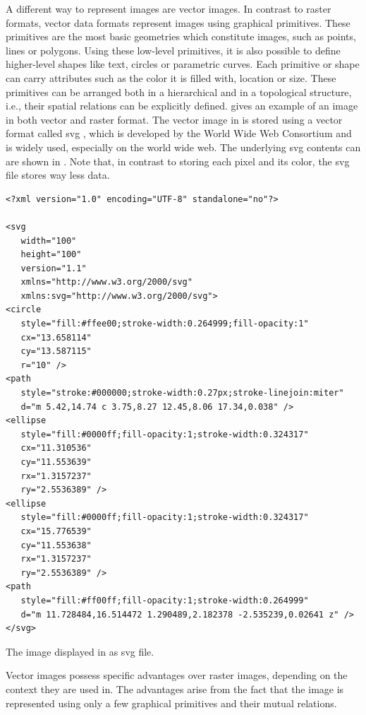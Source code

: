 A different way to represent images are vector images. In contrast to raster formats, vector data formats represent images using graphical primitives. These primitives are the most basic geometries which constitute images, such as points, lines or polygons. Using these low-level primitives, it is also possible to define higher-level shapes like text, circles or parametric curves. Each primitive or shape can carry attributes such as the color it is filled with, location or size. These primitives can be arranged both in a hierarchical and in a topological structure, i.e., their spatial relations can be explicitly defined.  gives an example of an image in both vector and raster format. The vector image in  is stored using a vector format called \gls{svg} \citep{w3csvg}, which is developed by the World Wide Web Consortium and is widely used, especially on the world wide web. The underlying \gls{svg} contents can are shown in . Note that, in contrast to storing each pixel and its color, the \gls{svg} file stores way less data. 

\begin{listing}
\begin{verbatim}
<?xml version="1.0" encoding="UTF-8" standalone="no"?>

<svg
   width="100"
   height="100"
   version="1.1"
   xmlns="http://www.w3.org/2000/svg"
   xmlns:svg="http://www.w3.org/2000/svg">
<circle
   style="fill:#ffee00;stroke-width:0.264999;fill-opacity:1"
   cx="13.658114"
   cy="13.587115"
   r="10" />
<path
   style="stroke:#000000;stroke-width:0.27px;stroke-linejoin:miter"
   d="m 5.42,14.74 c 3.75,8.27 12.45,8.06 17.34,0.038" />
<ellipse
   style="fill:#0000ff;fill-opacity:1;stroke-width:0.324317"
   cx="11.310536"
   cy="11.553639"
   rx="1.3157237"
   ry="2.5536389" />
<ellipse
   style="fill:#0000ff;fill-opacity:1;stroke-width:0.324317"
   cx="15.776539"
   cy="11.553638"
   rx="1.3157237"
   ry="2.5536389" />
<path
   style="fill:#ff00ff;fill-opacity:1;stroke-width:0.264999"
   d="m 11.728484,16.514472 1.290489,2.182378 -2.535239,0.02641 z" />
</svg>
\end{verbatim}
\caption{The image displayed in  as \gls{svg} file.}
\label{lst:vector-ex-svg}
\end{listing}


Vector images possess specific advantages over raster images, depending on the context they are used in. The advantages arise from the fact that the image is represented using only a few graphical primitives and their mutual relations.


